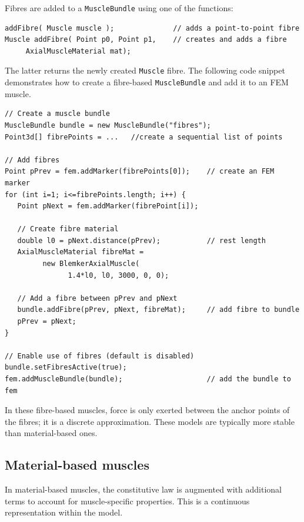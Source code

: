 Fibres are added to a {\tt MuscleBundle} using one of the functions:
\begin{lstlisting}[]
addFibre( Muscle muscle );              // adds a point-to-point fibre
Muscle addFibre( Point p0, Point p1,    // creates and adds a fibre
	 AxialMuscleMaterial mat);
\end{lstlisting}
The latter returns the newly created {\tt Muscle} fibre.  
The following code snippet demonstrates how to create a fibre-based 
{\tt MuscleBundle} and add it to an FEM muscle.
\lstset{numbers=left}
\begin{lstlisting}[]
// Create a muscle bundle
MuscleBundle bundle = new MuscleBundle("fibres");
Point3d[] fibrePoints = ...   //create a sequential list of points

// Add fibres
Point pPrev = fem.addMarker(fibrePoints[0]);    // create an FEM marker
for (int i=1; i<=fibrePoints.length; i++) {
   Point pNext = fem.addMarker(fibrePoint[i]);

   // Create fibre material
   double l0 = pNext.distance(pPrev);           // rest length
   AxialMuscleMaterial fibreMat = 
         new BlemkerAxialMuscle(
               1.4*l0, l0, 3000, 0, 0);

   // Add a fibre between pPrev and pNext
   bundle.addFibre(pPrev, pNext, fibreMat);     // add fibre to bundle
   pPrev = pNext;
}

// Enable use of fibres (default is disabled)
bundle.setFibresActive(true);
fem.addMuscleBundle(bundle);                    // add the bundle to fem
\end{lstlisting}
\lstset{numbers=none}

In these fibre-based muscles, force is only exerted between the anchor
points of the fibres; it is a discrete approximation.  These models
are typically more stable than material-based ones.

\subsection{Material-based muscles}
\label{sec:fem:materialmuscle}

In material-based muscles, the constitutive law is augmented with additional
terms to account for muscle-specific properties.  This is a continuous 
representation within the model.  

